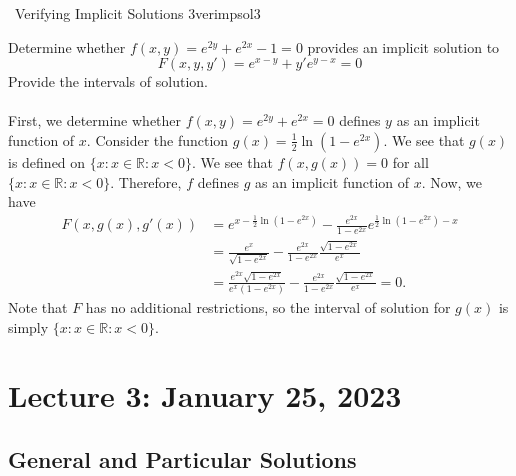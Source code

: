 \pagebreak

        \begin{example}{\Difficulty\,\Difficulty\,\,Verifying Implicit Solutions 3}{verimpsol3}
                    
            Determine whether \(f(x,y)=e^{2y}+e^{2x}-1=0\) provides an implicit solution to
            \begin{equation*}
                F(x,y,y')=e^{x-y}+y'e^{y-x}=0
            \end{equation*}
            Provide the intervals of solution.
            \\
            \\
            First, we determine whether \(f(x,y)=e^{2y}+e^{2x}=0\) defines \(y\) as an implicit function of \(x\). Consider the function \(g(x)=\frac{1}{2}\ln(1-e^{2x})\). We see that \(g(x)\) is defined on \(\{x:x\in\mathbb{R}:x<0\}\). We see that \(f(x,g(x))=0\) for all \(\{x:x\in\mathbb{R}:x<0\}\). Therefore, \(f\) defines \(g\) as an implicit function of \(x\). Now, we have
            \begin{align*}
                F(x,g(x),g'(x))&=e^{x-\frac{1}{2}\ln(1-e^{2x})}-\frac{e^{2x}}{1-e^{2x}}e^{\frac{1}{2}\ln(1-e^{2x})-x} \\
                &=\frac{e^x}{\sqrt{1-e^{2x}}}-\frac{e^{2x}}{1-e^{2x}}\frac{\sqrt{1-e^{2x}}}{e^x} \\
                &=\frac{e^{2x}\sqrt{1-e^{2x}}}{e^x(1-e^{2x})}-\frac{e^{2x}}{1-e^{2x}}\frac{\sqrt{1-e^{2x}}}{e^x}=0.
            \end{align*}
            Note that \(F\) has no additional restrictions, so the interval of solution for \(g(x)\) is simply \(\{x:x\in\mathbb{R}:x<0\}\).
            
        \end{example}

\pagebreak

\section{Lecture 3: January 25, 2023}

    \subsection{General and Particular Solutions}
    
